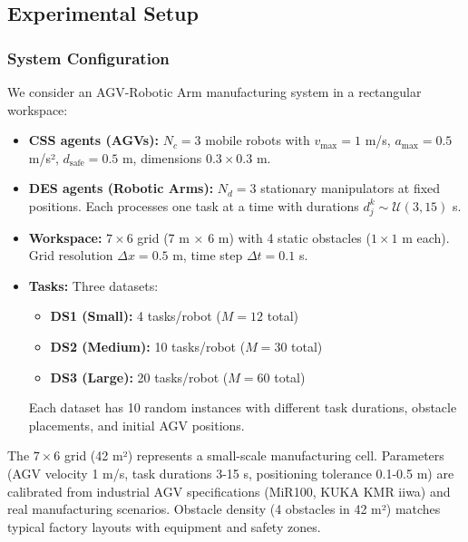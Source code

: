 \documentclass[manuscript,screen,review]{acmart}
\begin{document}
\subsection{Experimental Setup}

\subsubsection{System Configuration}

We consider an AGV-Robotic Arm manufacturing system in a rectangular workspace:

\begin{itemize}[leftmargin=*, itemsep=3pt]
    \item \textbf{CSS agents (AGVs):} $N_c = 3$ mobile robots with $v_{\max} = 1$ m/s, 
    $a_{\max} = 0.5$ m/s², $d_{\text{safe}} = 0.5$ m, dimensions $0.3 \times 0.3$ m.
    
    \item \textbf{DES agents (Robotic Arms):} $N_d = 3$ stationary manipulators 
    at fixed positions. Each processes one task at a time with durations 
    $d_j^k \sim \mathcal{U}(3, 15)$ s.
    
    \item \textbf{Workspace:} $7 \times 6$ grid (7 m × 6 m) with 4 static 
    obstacles ($1 \times 1$ m each). Grid resolution $\Delta x = 0.5$ m, 
    time step $\Delta t = 0.1$ s.
    
    \item \textbf{Tasks:} Three datasets:
    \begin{itemize}[itemsep=1pt]
        \item \textbf{DS1 (Small):} 4 tasks/robot ($M = 12$ total)
        \item \textbf{DS2 (Medium):} 10 tasks/robot ($M = 30$ total)
        \item \textbf{DS3 (Large):} 20 tasks/robot ($M = 60$ total)
    \end{itemize}
    Each dataset has 10 random instances with different task durations, 
    obstacle placements, and initial AGV positions.
\end{itemize}

The $7 \times 6$ grid (42 m²) represents a small-scale manufacturing cell. 
Parameters (AGV velocity 1 m/s, task durations 3-15 s, positioning tolerance 
0.1-0.5 m) are calibrated from industrial AGV specifications (MiR100, KUKA 
KMR iiwa) and real manufacturing scenarios. Obstacle density (4 obstacles in 
42 m²) matches typical factory layouts with equipment and safety zones.
\end{document}
